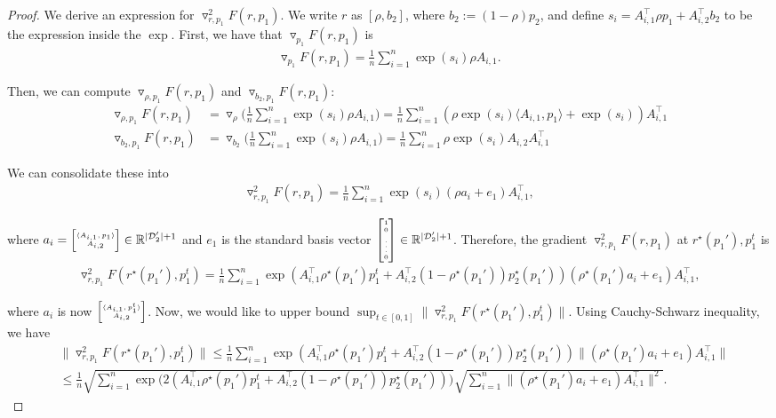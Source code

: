 \begin{proof}
We derive an expression for $\triangledown_{r, p_1}^2 F(r, p_1)$. 
We write $r$ as $[\rho, b_2]$, where $b_2 := (1 - \rho) p_2$, and define $s_i = A_{i, 1}^\top \rho p_1 + A_{i, 2}^\top b_2$ to be the expression inside the $\exp$. First, we have that $\triangledown_{p_1} F(r, p_1)$ is
\begin{align*}
    \triangledown_{p_1} F(r, p_1) = \frac{1}{n} \sum_{i = 1}^n \exp(s_i) \rho A_{i, 1}.  \nonumber
\end{align*}

Then, we can compute $\triangledown_{\rho, p_1} F(r, p_1)$ and $\triangledown_{b_2, p_1} F(r, p_1)$:
\begin{align*}
    \triangledown_{\rho, p_1} F(r, p_1) &= \triangledown_{\rho} \bigg(\frac{1}{n}\sum_{i = 1}^n \exp(s_i) \rho A_{i, 1} \bigg) = \frac{1}{n} \sum_{i= 1}^n (\rho \exp(s_i) \langle A_{i, 1}, p_1 \rangle + \exp(s_i)) A_{i, 1}^\top \nonumber \\
    \triangledown_{b_2, p_1} F(r, p_1) &= \triangledown_{b_2} \bigg(\frac{1}{n}\sum_{i = 1}^n \exp(s_i) \rho A_{i, 1} \bigg) = \frac{1}{n} \sum_{i = 1}^n \rho \exp(s_i) A_{i, 2} A_{i, 1}^\top \nonumber
\end{align*}

We can consolidate these into
\begin{align*}
    \triangledown_{r, p_1}^2 F(r, p_1) = \frac{1}{n}\sum_{i = 1}^n \exp(s_i) (\rho a_i + e_1) A_{i, 1}^\top, \nonumber
\end{align*}

where $a_i = \SmallMatrix{\langle A_{i, 1}, p_1 \rangle \\ A_{i, 2}}  \in \R^{|\D_2'| + 1}$ and $e_1$ is the standard basis vector $\SmallMatrix{1 \\ 0 \\ \vdots \\ 0} \in \R^{|\D_2'| + 1}$. Therefore, the gradient $\triangledown_{r, p_1}^2 F(r, p_1)$ at $r^\star(p_1'), p_1^t$ is
\begin{align*}
    \triangledown_{r, p_1}^2 F(r^\star(p_1'), p_1^t) = \frac{1}{n}\sum_{i = 1}^n \exp(A_{i, 1}^\top \rho^\star(p_1') p_1^t + A_{i, 2}^\top (1 - \rho^\star(p_1')) p_2^\star(p_1')) (\rho^\star(p_1') a_i + e_1) A_{i, 1}^\top,
\end{align*}

where $a_i$ is now $\SmallMatrix{\langle A_{i, 1}, p_1^t \rangle \\ A_{i, 2}}$. Now, we would like to upper bound $ \sup _{t \in [0, 1]} \|\triangledown_{r, p_1}^2 F(r^\star(p_1'), p_1^t) \|$. Using Cauchy-Schwarz inequality, we have
\begin{align}
    &\|\triangledown_{r, p_1}^2 F(r^\star(p_1'), p_1^t) \| \le \frac{1}{n}\sum_{i = 1}^n \exp(A_{i, 1}^\top \rho^\star(p_1') p_1^t + A_{i, 2}^\top (1 - \rho^\star(p_1')) p_2^\star(p_1')) \|(\rho^\star(p_1') a_i + e_1) A_{i, 1}^\top \| \nonumber \\
    &\le \frac{1}{n} \sqrt{\sum_{i = 1}^n \exp\big(2 (A_{i, 1}^\top \rho^\star(p_1') p_1^t + A_{i, 2}^\top (1 - \rho^\star(p_1')) p_2^\star(p_1'))\big)} \sqrt{\sum_{i=1}^n \|(\rho^\star(p_1') a_i + e_1) A_{i, 1}^\top \|^2}. \label{eq:m_bound}
\end{align}


\end{proof}
